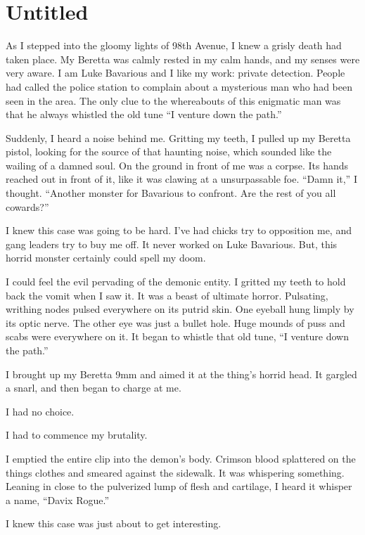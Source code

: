 \chapter{Untitled}

As I stepped into the gloomy lights of 98th Avenue, I knew a grisly
death had taken place. My Beretta was calmly rested in my calm hands,
and my senses were very aware. I am Luke Bavarious and I like my work:
private detection. People had called the police station to complain
about a mysterious man who had been seen in the area. The only clue to
the whereabouts of this enigmatic man was that he always whistled the
old tune ``I venture down the path.''

Suddenly, I heard a noise behind me. Gritting my teeth, I pulled up my
Beretta pistol, looking for the source of that haunting noise, which
sounded like the wailing of a damned soul. On the ground in front of me
was a corpse. Its hands reached out in front of it, like it was clawing
at a unsurpassable foe. ``Damn it,'' I thought. ``Another monster for
Bavarious to confront. Are the rest of you all cowards?''

I knew this case was going to be hard. I've had chicks try to opposition
me, and gang leaders try to buy me off. It never worked on Luke
Bavarious. But, this horrid monster certainly could spell my doom.

I could feel the evil pervading of the demonic entity. I gritted my
teeth to hold back the vomit when I saw it. It was a beast of ultimate
horror. Pulsating, writhing nodes pulsed everywhere on its putrid
skin. One eyeball hung limply by its optic nerve. The other eye was just
a bullet hole. Huge mounds of puss and scabs were everywhere on it. It
began to whistle that old tune, ``I venture down the path.''

I brought up my Beretta 9mm and aimed it at the thing's horrid head. It
gargled a snarl, and then began to charge at me.

I had no choice.

I had to commence my brutality.

I emptied the entire clip into the demon's body. Crimson blood
splattered on the things clothes and smeared against the sidewalk. It
was whispering something. Leaning in close to the pulverized lump of
flesh and cartilage, I heard it whisper a name, ``Davix Rogue.''

I knew this case was just about to get interesting.


